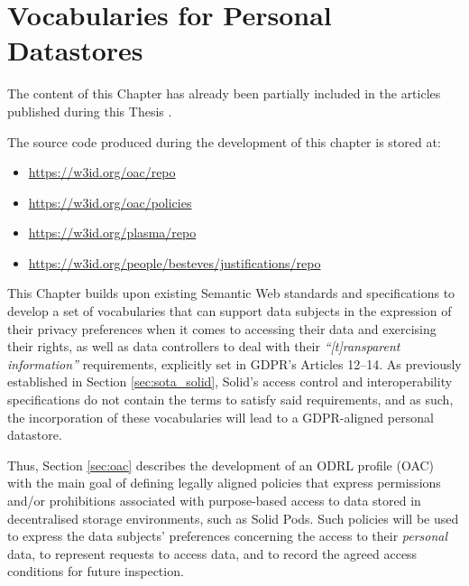 \chapter{Vocabularies for Personal Datastores}
\label{chap:vocabularies}

\begin{tcolorbox}[colback=royallavender!40]
The content of this Chapter has already been partially included in the articles published during this Thesis \citep{esteves_odrl_2021,esteves_using_2023,esteves_fostering_2022}.
\end{tcolorbox}

\begin{tcolorbox}[colback=royallavender!10]
The source code produced during the development of this chapter is stored at:
\begin{itemize}
    \item \url{https://w3id.org/oac/repo}
    \item \url{https://w3id.org/oac/policies}
    \item \url{https://w3id.org/plasma/repo}
    \item \url{https://w3id.org/people/besteves/justifications/repo}
\end{itemize}
\end{tcolorbox}

This Chapter builds upon existing Semantic Web standards and specifications to develop a set of vocabularies that can support data subjects in the expression of their privacy preferences when it comes to accessing their data and exercising their rights, as well as data controllers to deal with their \textit{``[t]ransparent information''} requirements, explicitly set in GDPR's Articles 12--14.
As previously established in Section \ref{sec:sota_solid}, Solid's access control and interoperability specifications do not contain the terms to satisfy said requirements, and as such, the incorporation of these vocabularies will lead to a GDPR-aligned personal datastore.

Thus, Section \ref{sec:oac} describes the development of an ODRL profile (OAC) with the main goal of defining legally aligned policies that express permissions and/or prohibitions associated with purpose-based access to data stored in decentralised storage environments, such as Solid Pods.
Such policies will be used to express the data subjects' preferences concerning the access to their \textit{personal} data, to represent requests to access data, and to record the agreed access conditions for future inspection.


